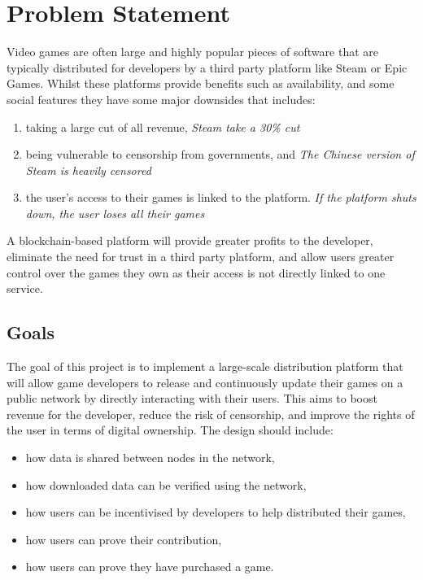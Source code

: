 
\chapter{Problem Statement}

Video games are often large and highly popular pieces of software that are typically distributed for developers by a third party platform like Steam or Epic Games. Whilst these platforms provide benefits such as availability, and some social features they have some major downsides that includes:
\vspace{1mm}
\begin{enumerate}[label=(\alph*)]
  \item taking a large cut of all revenue, \newline\textit{Steam take a 30\% cut}
  \item being vulnerable to censorship from governments, and \newline\textit{The Chinese version of Steam is heavily censored}
  \item the user's access to their games is linked to the platform. \newline\textit{If the platform shuts down, the user loses all their games}
\end{enumerate}
\vspace{1mm}
\noindent A blockchain-based platform will provide greater profits to the developer, eliminate the need for trust in a third party platform, and allow users greater control over the games they own as their access is not directly linked to one service.

\section{Goals}

The goal of this project is to implement a large-scale distribution platform that will allow game developers to release and continuously update their games on a public network by directly interacting with their users. This aims to boost revenue for the developer, reduce the risk of censorship, and improve the rights of the user in terms of digital ownership. The design should include:
\vspace{1mm}
\begin{itemize}
  \item how data is shared between nodes in the network,
  \item how downloaded data can be verified using the network,
  \item how users can be incentivised by developers to help distributed their games,
  \item how users can prove their contribution,
  \item how users can prove they have purchased a game.
\end{itemize}
\vspace{1mm}


